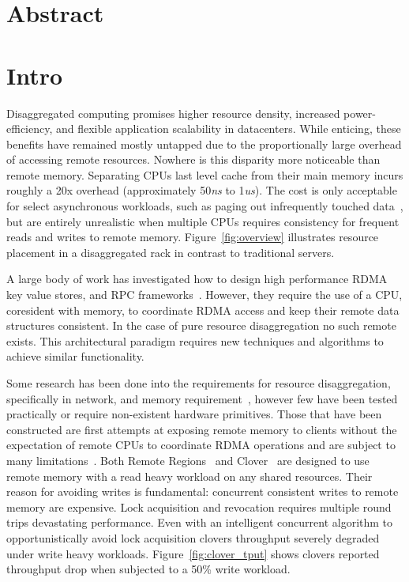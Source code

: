 \section{Abstract}

\section{Intro}
\label{sec:intro}

Disaggregated computing promises higher resource density, increased
power-efficiency, and flexible application scalability in datacenters.
While enticing, these benefits have remained mostly untapped due to the proportionally large
overhead of accessing remote resources. Nowhere is this disparity more
noticeable than remote memory. Separating CPUs last level cache from
their main memory incurs roughly a 20x overhead (approximately
50\textit{ns} to 1\textit{us}).  The cost is only acceptable for
select asynchronous workloads, such as paging out infrequently touched
data~\cite{infiniswap,legoos,leap}, but are entirely unrealistic when multiple CPUs
requires consistency for frequent reads and writes to remote memory.
Figure~\ref{fig:overview} illustrates resource placement in a
disaggregated rack in contrast to traditional servers.

A large body of work has investigated how to design high performance
RDMA key value stores, and RPC
frameworks~\cite{cell,sonuma,storm,farm,herd,erpc}. However, they
require the use of a CPU, coresident with memory, to coordinate RDMA
access and keep their remote data structures consistent. In the case
of pure resource disaggregation no such remote exists. This
architectural paradigm requires new techniques and algorithms to achieve
similar functionality. 

Some research has been done into the requirements for resource
disaggregation, specifically in network, and memory
requirement~\cite{requirements, aguilera2019designing, disandapp,
amanda-hotnets}, however few have been tested practically or require
non-existent hardware primitives. Those that have been constructed are
first attempts at exposing remote memory to clients without the
expectation of remote CPUs to coordinate RDMA operations and are
subject to many limitations~\cite{reigons, clover}. Both Remote
Regions~\cite{reigons} and Clover~\cite{clover} are designed to use
remote memory with a read heavy workload on any shared resources.
Their reason for avoiding writes is fundamental: concurrent consistent
writes to remote memory are expensive. Lock acquisition and revocation
requires multiple round trips devastating performance. Even with an
intelligent concurrent algorithm to opportunistically avoid lock
acquisition clovers throughput severely degraded under write heavy
workloads. Figure~\ref{fig:clover_tput} shows clovers reported
throughput drop when subjected to a 50\% write workload.

